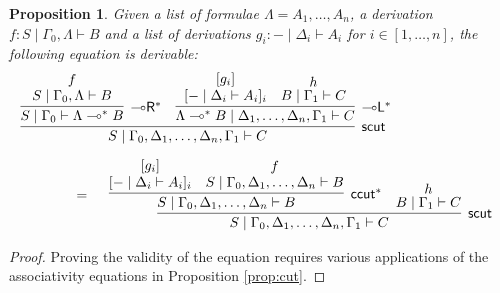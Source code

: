 \documentclass[sn-mathphys-num]{sn-jnl}%
\newcommand{\GG}{\Gamma}
\newcommand{\GD}{\Delta}
\newcommand{\GL}{\Lambda}
\newcommand{\vd}{\vdash}
\newcommand{\tr}{\otimes\mathsf{R}}
\newcommand{\lolli}{\multimap}
\newcommand{\lleft}{{\lolli}\mathsf{L}}
\newcommand{\lright}{{\lolli}\mathsf{R}}
\newcommand{\proofbox}[1]{\begin{tabular}{l} #1 \end{tabular}}
\newcommand{\mf}[1]{\mathsf{#1}}
\newcommand{\scut}[2]{\mf{scut} (#1 , #2)}
\theoremstyle{thmstyleone}%
\newtheorem{proposition}[theorem]{Proposition}%
\theoremstyle{thmstyletwo}%
\theoremstyle{thmstylethree}%
\begin{document}
\begin{proposition}\label{scut-or-ols}
Given a list of formulae $\GL = A_1, \dots , A_n$, a derivation $f : S \mid \GG_0 , \GL \vd B$ and a list of derivations $g_i : {-} \mid \GD_i \vd A_i$ for $i \in [1,\dots , n]$, the following equation is derivable:
\begin{displaymath}
  \begin{array}{l}
    \infer[\mf{scut}]{S \mid \GG_0, \GD_1,\dots,\GD_n, \GG_1 \vd C}{
    \infer[\lright^*]{S \mid \GG_0 \vd \GL \lolli^* B}{
    \deduce{S \mid \GG_0 , \GL \vd B}{f}
    }
    &
    \infer[\lleft^*]{\GL \lolli^* B \mid \GD_1,\dots,\GD_n , \GG_1 \vd C}{
    \deduce{[ {-} \mid \GD_i \vd A_i]_i}{[g_i]}
    &
    \deduce{B \mid \GG_1 \vd C}{h}
    }
    }
    \\[10pt]
    \qquad \qquad
    =
    \proofbox{
    \infer[\mf{scut}]{S \mid \GG_0, \GD_1,\dots,\GD_n, \GG_1 \vd C}{
    \infer[\mf{ccut}^*]{S \mid \GG_0 , \GD_1,\dots,\GD_n \vd B}{
    \deduce{[ {-} \mid \GD_i \vd A_i]_i}{[g_i]}
    &
    \deduce{S \mid \GG_0 , \GD_1,\dots,\GD_n \vd B}{f}
    }
    &
    \deduce{B \mid \GG_1 \vd C}{h}
    }
    }
  \end{array}
\end{displaymath} 
\end{proposition}
\begin{proof}
  Proving the validity of the equation requires various applications of the associativity equations in Proposition \ref{prop:cut}.
\end{proof}
\end{document}
